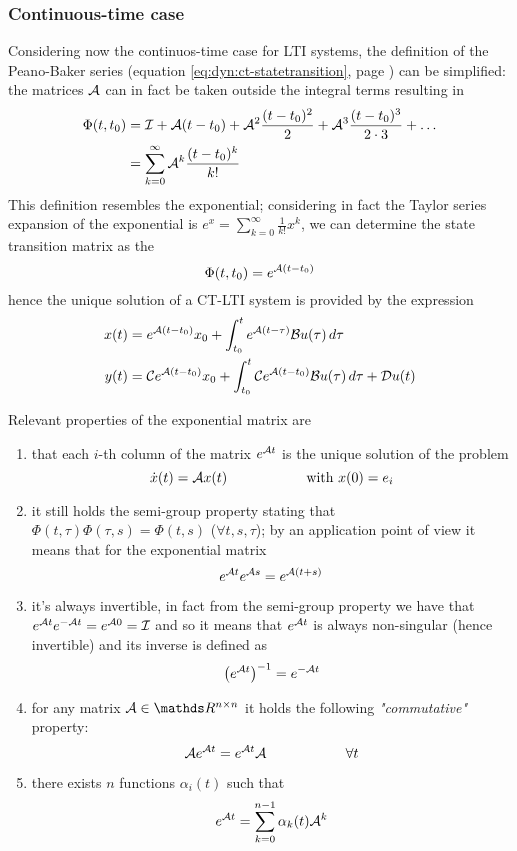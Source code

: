 	\subsubsection{Continuous-time case}
	Considering now the continuos-time case for LTI systems, the definition of the Peano-Baker series (equation \ref{eq:dyn:ct-statetransition}, page \pageref{eq:dyn:ct-statetransition}) can be simplified: the matrices $\mathcal{A}$ can in fact be taken outside the integral terms resulting in
	\begin{align*}
		\Phi(t,t_0) & = \mathcal{I} + \mathcal{A}(t-t_0) + \mathcal{A}^2 \frac{(t-t_0)^2}{2} + \mathcal{A}^3 \frac{(t-t_0)^3}{2\cdot 3} + \dots \\ & = \sum_{k=0}^{\infty} \mathcal{A}^k \frac{(t-t_0)^k}{k!}
	\end{align*}
	This definition resembles the exponential; considering in fact the Taylor series expansion of the exponential is $e^x = \sum_{k=0}^\infty \frac 1{k!}x^k$, we can determine the state transition matrix as the 
	\begin{equation}
		\Phi(t,t_0) = e^{\mathcal{A}(t-t_0)}
	\end{equation}
	hence the unique solution of a CT-LTI system is provided by the expression
	\begin{equation}
	\begin{split}
		x(t) & = e^{\mathcal{A}(t-t_0)} x_0 + \int_{t_0}^t e^{\mathcal{A}(t-\tau)} \mathcal{B} u(\tau) \, d\tau \\
		y(t) & = \mathcal{C} e^{\mathcal{A}(t-t_0)} x_0 + \int_{t_0}^t \mathcal{C} e^{\mathcal{A}(t-t_0)} \mathcal{B} u(\tau)\, d\tau + \mathcal{D} u(t)
	\end{split}
	\end{equation}
	
	Relevant properties of the exponential matrix are
	\begin{enumerate}[\itshape i)]
		\item that each $i$-th column of the matrix $e^{\mathcal{A} t}$ is the unique solution of the problem
		\[ \dot x(t) = \mathcal{A} x(t) \hspace{2cm} \textrm{with } x(0)= e_i \]
		\item it still holds the semi-group property stating that $\Phi(t,\tau) \Phi(\tau,s) = \Phi(t,s)$ ($\forall t,s,\tau$); by an application point of view it means that for the exponential matrix
		\[ e^{\mathcal{A} t} e^{\mathcal{A} s} = e^{\mathcal{A}(t+s)} \]
		\item it's always invertible, in fact from the semi-group property we have that $e^{\mathcal{A} t} e^{-\mathcal{A} t} = e^{\mathcal{A} 0} = \mathcal{I}$ and so it means that $e^{\mathcal{A} t}$ is always non-singular (hence invertible) and its inverse is defined as
		\[ \big(e^{\mathcal{A} t} \big)^{-1} = e^{-\mathcal{A} t} \]
		\item for any matrix $\A \in \mathds R^{n\times n}$ it holds the following \textit{"commutative"} property:
		\[ \mathcal{A} e^{\mathcal{A} t} = e^{\mathcal{A} t} \mathcal{A} \hspace{2cm} \forall t \]
		
		\item there exists $n$ functions $\alpha_i(t)$ such that
		\[ e^{\mathcal{A} t} = \sum_{k=0}^{n-1} \alpha_k (t) \mathcal{A}^k \]
		
	\end{enumerate}
	
